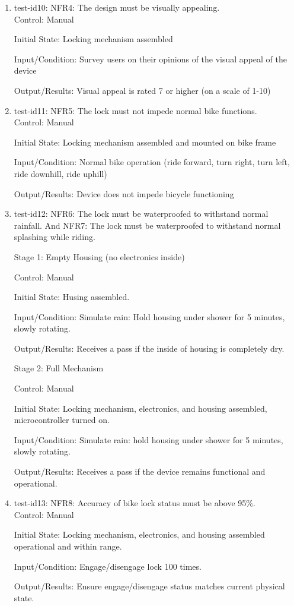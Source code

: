 \documentclass[12pt, titlepage]{article}
\begin{document}
\begin{enumerate}

\item{test-id10: NFR4: The design must be visually appealing. \\}
Control: Manual 

Initial State: Locking mechanism assembled 

Input/Condition: Survey users on their opinions of the visual appeal of the device 

Output/Results: Visual appeal is rated 7 or higher (on a scale of 1-10) 

\item{test-id11: NFR5: The lock must not impede normal bike functions. \\}
Control: Manual 

Initial State: Locking mechanism assembled and mounted on bike frame 

Input/Condition: Normal bike operation (ride forward, turn right, turn left, ride downhill, ride uphill) 

Output/Results: Device does not impede bicycle functioning 

\item{test-id12: NFR6: The lock must be waterproofed to withstand normal rainfall. And NFR7:  The lock must be waterproofed to withstand normal splashing while riding. \\}

Stage 1: Empty Housing (no electronics inside) 

Control: Manual 

Initial State: Husing assembled.

Input/Condition: Simulate rain: Hold housing under shower for 5 minutes, slowly rotating.

Output/Results: Receives a pass if the inside of housing is completely dry.

Stage 2: Full Mechanism 

Control: Manual 

Initial State: Locking mechanism, electronics, and housing assembled, microcontroller turned on.

Input/Condition: Simulate rain: hold housing under shower for 5 minutes, slowly rotating.

Output/Results: Receives a pass if the device remains functional and operational.

\item{test-id13: NFR8: Accuracy of bike lock status must be above 95\%. \\}
Control: Manual 

Initial State: Locking mechanism, electronics, and housing assembled operational and within range.

Input/Condition: Engage/disengage lock 100 times. 

Output/Results: Ensure engage/disengage status matches current physical state.
\end{enumerate}
\end{document}
